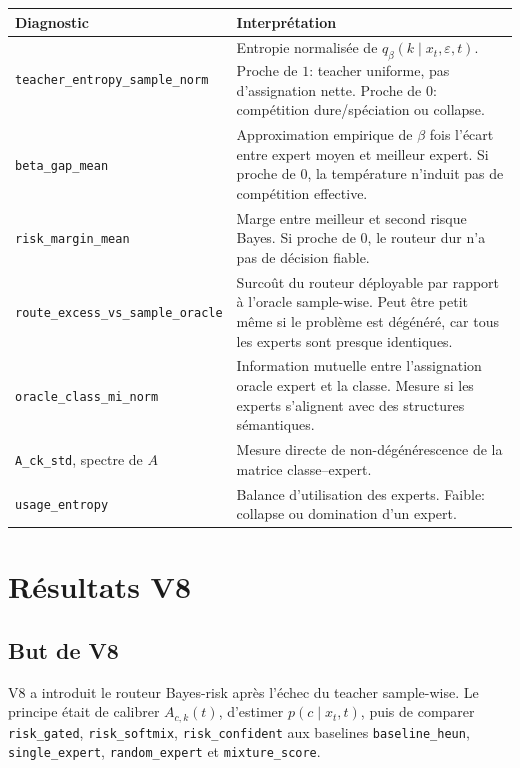\documentclass[11pt,a4paper]{article}
\newcommand{\1}{\mathbf{1}}
\newcommand{\eps}{\varepsilon}
\newcommand{\xt}{x_t}
\begin{document}
\begin{longtable}{p{4.2cm}p{10.3cm}}
\toprule
Diagnostic & Interprétation \\
\midrule
\endhead
\texttt{teacher\_entropy\_sample\_norm} & Entropie normalisée de $q_\beta(k\mid\xt,\eps,t)$. Proche de $1$: teacher uniforme, pas d'assignation nette. Proche de $0$: compétition dure/spéciation ou collapse. \\
\texttt{beta\_gap\_mean} & Approximation empirique de $\beta$ fois l'écart entre expert moyen et meilleur expert. Si proche de $0$, la température n'induit pas de compétition effective. \\
\texttt{risk\_margin\_mean} & Marge entre meilleur et second risque Bayes. Si proche de $0$, le routeur dur n'a pas de décision fiable. \\
\texttt{route\_excess\_vs\_sample\_oracle} & Surcoût du routeur déployable par rapport à l'oracle sample-wise. Peut être petit même si le problème est dégénéré, car tous les experts sont presque identiques. \\
\texttt{oracle\_class\_mi\_norm} & Information mutuelle entre l'assignation oracle expert et la classe. Mesure si les experts s'alignent avec des structures sémantiques. \\
\texttt{A\_ck\_std}, spectre de $A$ & Mesure directe de non-dégénérescence de la matrice classe--expert. \\
\texttt{usage\_entropy} & Balance d'utilisation des experts. Faible: collapse ou domination d'un expert. \\
\bottomrule
\end{longtable}

\section{Résultats V8}

\subsection{But de V8}

V8 a introduit le routeur Bayes-risk après l'échec du teacher sample-wise. Le principe était de calibrer $A_{c,k}(t)$, d'estimer $p(c\mid\xt,t)$, puis de comparer \texttt{risk\_gated}, \texttt{risk\_softmix}, \texttt{risk\_confident} aux baselines \texttt{baseline\_heun}, \texttt{single\_expert}, \texttt{random\_expert} et \texttt{mixture\_score}.
\end{document}
